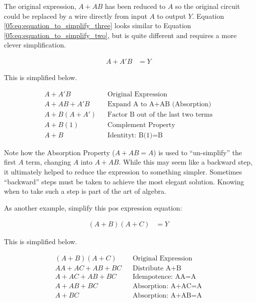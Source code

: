 The original expression, $ A+AB $ has been reduced to  $ A $ so the original circuit could be replaced by a wire directly from input  $ A $ to output  $ Y $. Equation \ref{05:eq:equation_to_simplify_three} looks similar to Equation \ref{05:eq:equation_to_simplify_two}, but is quite different and requires a more clever simplification.

\begin{align}
  \label{05:eq:equation_to_simplify_three}
  A+A'B &= Y
\end{align}

This is simplified below.

\begin{align}
  \label{05:soln:equation_to_simplify_three}
  A+A'B && \text{Original Expression} \\
  \nonumber
  A+AB+A'B && \text{Expand A to A+AB (Absorption)} \\
  \nonumber
  A+B(A+A') && \text{Factor B out of the last two terms} \\
  \nonumber
  A+B(1) && \text{Complement Property} \\
  \nonumber
  A+B && \text{Identityt: B(1)=B} 
\end{align}

Note how the Absorption Property ($ A + AB = A $) is used to ``un-simplify'' the first  $ A $ term, changing  $ A $ into $ A + AB $. While this may seem like a backward step, it ultimately helped to reduce the expression to something simpler. Sometimes ``backward'' steps must be taken to achieve the most elegant solution. Knowing when to take such a step is part of the art of algebra. 

As another example, simplify this \gls{pos} expression equation: 

\begin{align}
  \label{05:eq:equation_to_simplify_four}
  (A+B)(A+C) &= Y
\end{align}

This is simplified below.

\begin{align}
  \label{05:soln:equation_to_simplify_four}
  (A+B)(A+C) && \text{Original Expression} \\
  \nonumber
  AA+AC+AB+BC && \text{Distribute A+B} \\
  \nonumber
  A+AC+AB+BC && \text{Idempotence: AA=A} \\
  \nonumber
  A+AB+BC && \text{Absorption: A+AC=A} \\
  \nonumber
  A+BC && \text{Absorption: A+AB=A}
\end{align}

